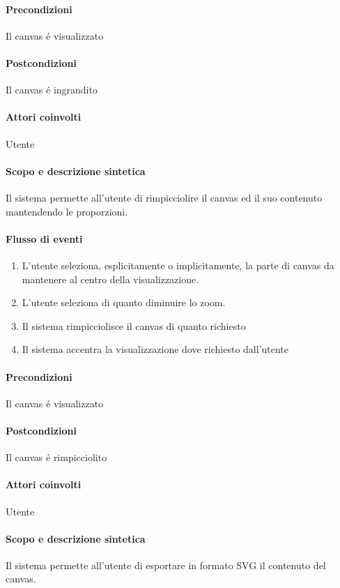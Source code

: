 \paragraph{Precondizioni} Il canvas \'e visualizzato
\paragraph{Postcondizioni} Il canvas \'e ingrandito

\paragraph{Attori coinvolti} Utente
\paragraph{Scopo e descrizione sintetica} 
Il sistema permette all'utente di rimpicciolire il canvas ed il suo contenuto mantendendo le proporzioni.
\paragraph{Flusso di eventi}
\begin{enumerate}
\item L'utente seleziona, esplicitamente o implicitamente, la parte di canvas da mantenere al centro della visualizzazione.
\item L'utente seleziona di quanto diminuire lo zoom.
\item Il sistema rimpicciolisce il canvas di quanto richiesto
\item Il sistema accentra la visualizzazione dove richiesto dall'utente
\end{enumerate}
\paragraph{Precondizioni} Il canvas \'e visualizzato
\paragraph{Postcondizioni} Il canvas \'e rimpicciolito

\paragraph{Attori coinvolti} Utente
\paragraph{Scopo e descrizione sintetica} 
Il sistema permette all'utente di esportare in formato SVG il contenuto del canvas.
